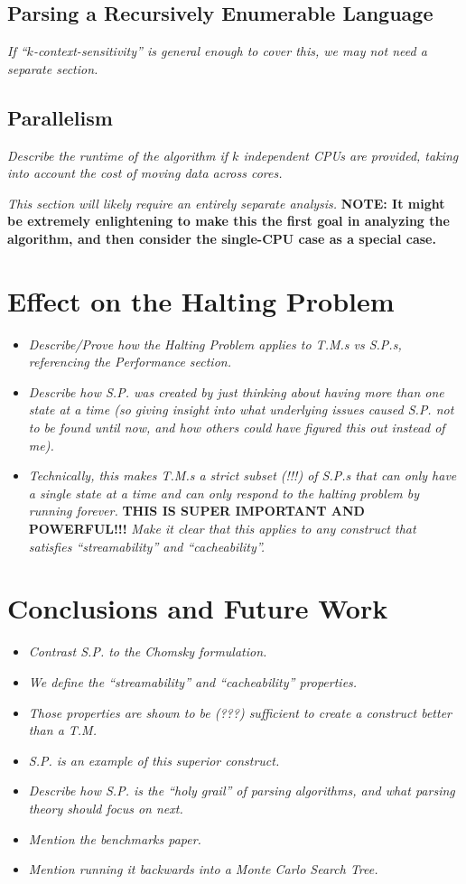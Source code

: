 \documentclass{article}
\begin{document}
\subsection{Parsing a Recursively Enumerable Language}
\textit{If ``$k$-context-sensitivity'' is general enough to cover this, we may not need a separate section.}

\subsection{Parallelism}
\textit{Describe the runtime of the algorithm if $k$ independent CPUs are provided, taking into account the cost of moving data across cores.}

\textit{This section will likely require an entirely separate analysis.} \textbf{NOTE: It might be extremely enlightening to make this the first goal in analyzing the algorithm, and then consider the single-CPU case as a special case.}

\section{Effect on the Halting Problem}
\begin{itemize}
  \item \textit{Describe/Prove how the Halting Problem applies to T.M.s vs S.P.s, referencing the Performance section.}
  \item \textit{Describe how S.P. was created by just thinking about having more than one state at a time (so giving insight into what underlying issues caused S.P. not to be found until now, and how others could have figured this out instead of me).}
  \item \textit{Technically, this makes T.M.s a strict subset (!!!) of S.P.s that can only have a single state at a time and can only respond to the halting problem by running forever.} \textbf{THIS IS SUPER IMPORTANT AND POWERFUL!!!} \textit{Make it clear that this applies to any construct that satisfies ``streamability'' and ``cacheability''.}
\end{itemize}

\section{Conclusions and Future Work}
\begin{itemize}
  \item \textit{Contrast S.P. to the Chomsky formulation.}
  \item \textit{We define the ``streamability'' and ``cacheability'' properties.}
  \item \textit{Those properties are shown to be (???) sufficient to create a construct better than a T.M.}
  \item \textit{S.P. is an example of this superior construct.}
  \item \textit{Describe how S.P. is the ``holy grail'' of parsing algorithms, and what parsing theory should focus on next.}
  \item \textit{Mention the benchmarks paper.}
  \item \textit{Mention running it backwards into a Monte Carlo Search Tree.}
\end{itemize}
\end{document}
